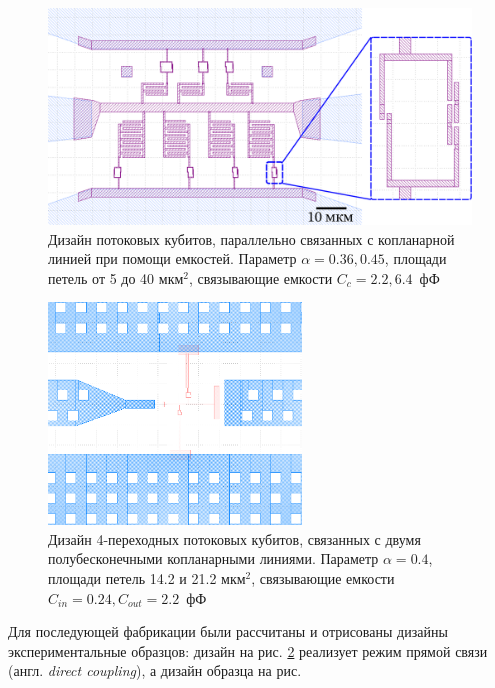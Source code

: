 \begin{figure}[h]
	\centering
	\includegraphics[width=1\textwidth]{images/fig_qubits_design.png}
	\caption{Дизайн потоковых кубитов, параллельно связанных с копланарной линией при помощи емкостей. Параметр $\alpha=0.36,0.45$, площади петель от 5 до 40 мкм$^2$, связывающие емкости $C_c=2.2,6.4$~фФ }
	\label{img: 4jj_side}
\end{figure} 
\begin{figure}[h]
	\centering
	\includegraphics[width=0.6\textwidth]{images/SPS_design2.png}
	\caption{Дизайн 4-переходных потоковых кубитов, связанных с двумя полубесконечными копланарными линиями. Параметр $\alpha=0.4$, площади петель 14.2 и 21.2 мкм$^2$, связывающие емкости $C_{in}=0.24, C_{out} = 2.2 $~фФ }
	\label{fig: qubits_sps}
\end{figure} 
Для последующей фабрикации были рассчитаны и отрисованы дизайны экспериментальные образцов: дизайн на рис. \ref{fig: qubits_sps} реализует режим прямой связи (англ. \textit{direct coupling}), а дизайн образца на рис.
